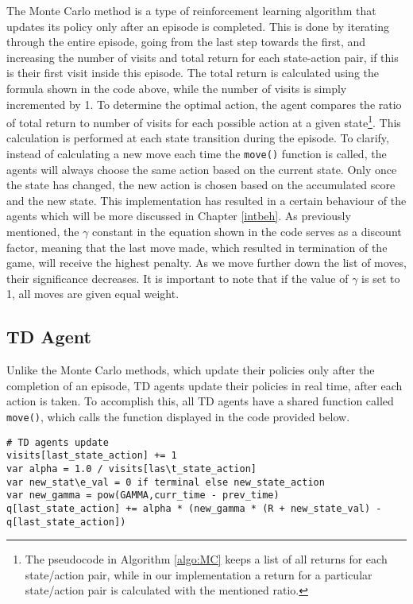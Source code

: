 The Monte Carlo method is a type of reinforcement learning algorithm that updates its policy only after an episode is completed. This is done by iterating through the entire episode, going from the last step towards the first, and increasing the number of visits and total return for each state-action pair, if this is their first visit inside this episode. The total return is calculated using the formula shown in the code above, while the number of visits is simply incremented by 1. To determine the optimal action, the agent compares the ratio of total return to number of visits for each possible action at a given state\footnote{The pseudocode in Algorithm \ref{algo:MC} keeps a list of all returns for each state/action pair, while in our implementation a return for a particular state/action pair is calculated with the mentioned ratio.}. This calculation is performed at each state transition during the episode. To clarify, instead of calculating a new move each time the \texttt{move()} function is called, the agents will always choose the same action based on the current state. Only once the state has changed, the new action is chosen based on the accumulated score and the new state. This implementation has resulted in a certain behaviour of the agents which will be more discussed in Chapter \ref{intbeh}.
As previously mentioned, the $\gamma$ constant in the equation shown in the code serves as a discount factor, meaning that the last move made, which resulted in termination of the game, will receive the highest penalty. As we move further down the list of moves, their significance decreases. It is important to note that if the value of $\gamma$ is set to 1, all moves are given equal weight. 

\subsection{TD Agent}	
Unlike the Monte Carlo methods, which update their policies only after the completion of an episode, TD agents update their policies in real time, after each action is taken. To accomplish this, all TD agents have a shared function called \texttt{move()}, which calls the function displayed in the code provided below. 

\begin{center}
\hrulefill
\begin{lstlisting}
# TD agents update
visits[last_state_action] += 1
var alpha = 1.0 / visits[las\t_state_action]
var new_stat\e_val = 0 if terminal else new_state_action
var new_gamma = pow(GAMMA,curr_time - prev_time)
q[last_state_action] += alpha * (new_gamma * (R + new_state_val) - q[last_state_action])
\end{lstlisting}
\hrulefill
\end{center}

